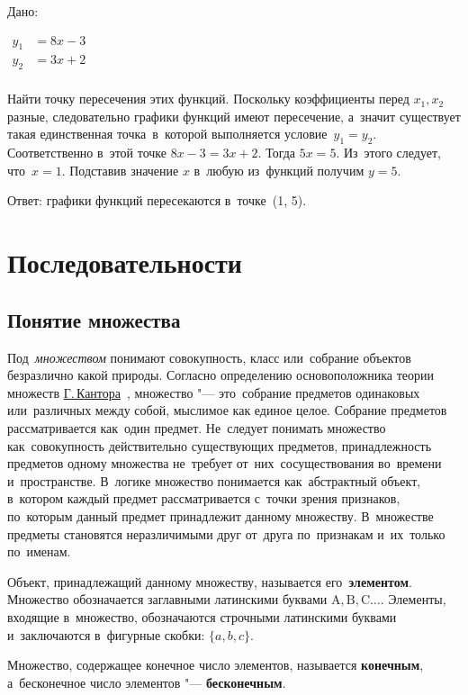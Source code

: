 \documentclass[]{scrartcl}
\begin{document}
\begin{Thexmpl}\label{ex:two-linear-1}
	Дано:
	
	$\begin{aligned}
	y_{1}&=8x - 3\\
	y_{2}&=3x + 2\\
	\end{aligned}$
	
	Найти точку пересечения этих функций. Поскольку коэффициенты перед $x_1, x_2$ разные, следовательно графики функций имеют пересечение, а~значит существует такая единственная точка~в~которой выполняется условие~$y_1=y_2$. Соответственно в~этой точке $8x - 3 = 3x + 2$. Тогда $5x=5$. Из~этого следует, что~$x=1$. Подставив значение $x$ в~любую из~функций получим $y=5$.
	
	Ответ: графики функций пересекаются в~точке~(1, 5).
\end{Thexmpl}

\section{Последовательности}
\subsection{Понятие множества}\label{multiple:definition}
Под~\emph{множеством} понимают совокупность, класс или~собрание объектов безразлично какой природы. Согласно определению основоположника теории множеств \href{https://ru.wikipedia.org/wiki/Кантор,_Георг}{Г.\,Кантора}~\cite{Wiki:Kantor}, множество "--- это~собрание предметов одинаковых или~различных между собой, мыслимое как единое целое. Собрание предметов рассматривается как~один предмет. Не~следует понимать множество как~совокупность действительно существующих предметов, принадлежность предметов одному множества не~требует от~них~сосуществования во~времени и~пространстве. В~логике множество понимается как~абстрактный объект, в~котором каждый предмет рассматривается с~точки зрения признаков, по~которым данный предмет принадлежит данному множеству. В~множестве предметы становятся неразличимыми друг от~друга по~признакам и~их~только по~именам.

Объект, принадлежащий данному множеству, называется его~\textbf{элементом}. Множество обозначается заглавными латинскими буквами ${\text{A}, \text{B}, \text{C}\ldots}$. Элементы, входящие в~множество, обозначаются строчными латинскими буквами и~заключаются в~фигурные скобки: ${\{a,b,c\}}$.

Множество, содержащее конечное число элементов, называется \textbf{конечным}, а~бесконечное число элементов "--- \textbf{бесконечным}.
\end{document}
